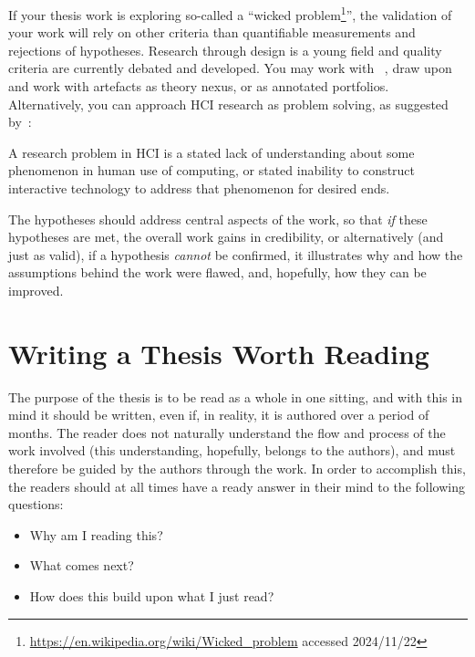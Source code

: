 If your thesis work is exploring so-called a ``wicked problem\footnote{\url{https://en.wikipedia.org/wiki/Wicked_problem} accessed 2024/11/22}'', the validation
of your work will rely on other criteria than quantifiable measurements and
rejections of hypotheses.  Research through design is a young field and
quality criteria are currently debated and developed. You may work with
\citeauthor{Zimmerman2007:POTSCOHFICS2007}~\cite{Zimmerman2007:POTSCOHFICS2007}, draw upon
\citeauthor{Gaver2012:POTSCOHFICS2012}~\cite{Gaver2012:POTSCOHFICS2012} and work with artefacts as theory
nexus, or as annotated portfolios. Alternatively, you can approach HCI
research as problem solving, as suggested by~\citeauthor{Oulasvirta2016:POT2CCOHFICS2016}:

\begin{displayquote}
  A research problem in HCI is a stated lack of understanding about some
  phenomenon in human use of computing, or stated inability to construct
  interactive technology to address that phenomenon for desired
  ends.
\end{displayquote}


The hypotheses should address central aspects of the work, so that \emph{if}
these hypotheses are met, the overall work gains in credibility, or
alternatively (and just as valid), if a hypothesis \emph{cannot} be
confirmed, it illustrates why and how the assumptions behind the work were
flawed, and, hopefully, how they can be improved.



\section{Writing a Thesis Worth Reading}
\label{sec:writ-thes-read}

The purpose of the thesis is to be read as a whole in one sitting, and with
this in mind it should be written, even if, in reality, it is authored over
a period of months.  The reader does not naturally understand the flow and
process of the work involved (this understanding, hopefully, belongs to the
authors), and must therefore be guided by the authors through the work.  In
order to accomplish this, the readers should at all times have a ready
answer in their mind to the following questions:

\begin{itemize}
\item Why am I reading this?
\item What comes next?
\item How does this build upon what I just read?
\end{itemize}

